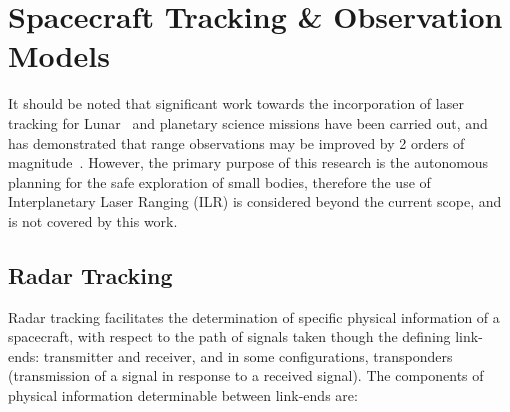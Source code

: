 \section{Spacecraft Tracking \& Observation Models}

It should be noted that significant work towards the incorporation of laser
tracking for Lunar~\cite{Bauer2016, Bauer2017} and planetary science missions
have been carried out, and has demonstrated that range observations may be
improved by 2 orders of magnitude~\cite{Dirkx2019}. However, the primary purpose
of this research is the autonomous planning for the safe exploration of small
bodies, therefore the use of Interplanetary Laser Ranging (ILR) is considered
beyond the current scope, and is not covered by this work.


\subsection{Radar Tracking}

Radar tracking facilitates the determination of specific physical information of
a spacecraft, with respect to the path of signals taken though the defining
link-ends: transmitter and receiver, and in some configurations, transponders
(transmission of a signal in response to a received signal). The components of
physical information determinable between link-ends are:

